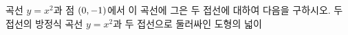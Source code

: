 곡선 $y=x^2$과 점 $(0{,}\mkern3mu\mathopen{}-1)$에서 이 곡선에 그은 두 접선에 대하여 다음을 구하시오.
 두 접선의 방정식
 곡선 $y=x^2$과 두 접선으로 둘러싸인 도형의 넓이
